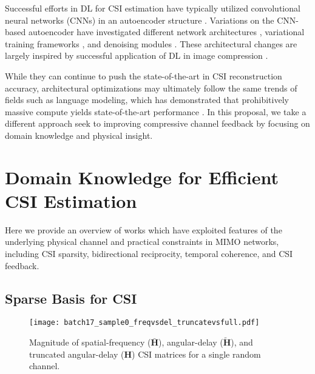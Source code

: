 
Successful efforts in DL for CSI estimation have typically utilized convolutional neural networks (CNNs) in an autoencoder structure \cite{ref:csinet}. Variations on the CNN-based autoencoder have investigated different network architectures \cite{ref:Lu2020CRNet}, variational training frameworks \cite{ref:Hussien2020PRVNet}, and denoising modules \cite{ref:Sun2020AnciNet}. These architectural changes are largely inspired by successful application of DL in image compression \cite{ref:szegedy2017inception,ref:balle2017end,ref:balle2017end}.

While they can continue to push the state-of-the-art in CSI reconstruction accuracy, architectural optimizations may ultimately follow the same trends of fields such as language modeling, which has demonstrated that prohibitively massive compute yields state-of-the-art performance \cite{ref:brown2020language}. In this proposal, we take a different approach seek to improving compressive channel feedback by focusing on domain knowledge and physical insight.


\section{Domain Knowledge for Efficient CSI Estimation}
\label{sect:dl_csi}


Here we provide an overview of works which have exploited features of the underlying physical channel and practical constraints in MIMO networks, including CSI sparsity, bidirectional reciprocity, temporal coherence, and CSI feedback.

\subsection{Sparse Basis for CSI}

\begin{figure}[htb]
	\centering
	\texttt{[image: batch17\_sample0\_freqvsdel\_truncatevsfull.pdf]}
	\medskip
	\caption{Magnitude of spatial-frequency ($\bar{\mathbf H}$), angular-delay ($\tilde{\mathbf H}$), and truncated angular-delay ($\mathbf H$) CSI matrices for a single random channel.}
	\label{fig:freq-vs-delay}
\end{figure}

